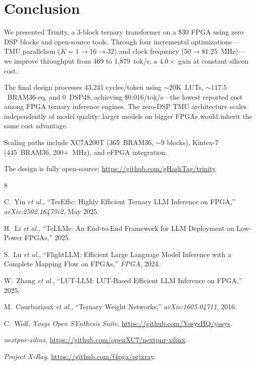 \documentclass[conference]{IEEEtran}
\begin{document}
\section{Conclusion}

We presented Trinity, a 3-block ternary transformer on a \$30 FPGA using zero
DSP blocks and open-source tools.  Through four incremental optimizations---TMU
parallelism ($K\!=\!1 \to 16 \to 32$) and clock frequency (50$\to$81.25~MHz)---
we improve throughput from 469 to 1,879~tok/s, a $4.0\times$ gain at constant
silicon cost.

The final design processes 43,241 cycles/token using ${\sim}20$K~LUTs,
${\sim}117.5$~BRAM36-eq, and 0~DSP48, achieving \$0.016/tok/s---the lowest
reported cost among FPGA ternary inference engines.  The zero-DSP TMU
architecture scales independently of model quality: larger models on bigger
FPGAs would inherit the same cost advantage.

Scaling paths include XC7A200T (365~BRAM36, ${\sim}9$ blocks), Kintex-7
(445~BRAM36, 200+~MHz), and eFPGA integration.

The design is fully open-source:
\url{https://github.com/gHashTag/trinity}


\begin{thebibliography}{8}

C.~Yin \textit{et al.}, ``TerEffic: Highly Efficient Ternary LLM Inference
on FPGA,'' \textit{arXiv:2502.16473v2}, May 2025.

H.~Li \textit{et al.}, ``TeLLMe: An End-to-End Framework for LLM Deployment
on Low-Power FPGAs,'' 2025.

S.~Lu \textit{et al.}, ``FlightLLM: Efficient Large Language Model Inference
with a Complete Mapping Flow on FPGAs,'' \textit{FPGA}, 2024.

W.~Zhang \textit{et al.}, ``LUT-LLM: LUT-Based Efficient LLM Inference on
FPGA,'' 2025.

M.~Courbariaux \textit{et al.}, ``Ternary Weight Networks,''
\textit{arXiv:1605.04711}, 2016.

C.~Wolf, \textit{Yosys Open SYnthesis Suite},
\url{https://github.com/YosysHQ/yosys}.

\textit{nextpnr-xilinx},
\url{https://github.com/openXC7/nextpnr-xilinx}.

\textit{Project X-Ray},
\url{https://github.com/f4pga/prjxray}.

\end{thebibliography}
\end{document}
